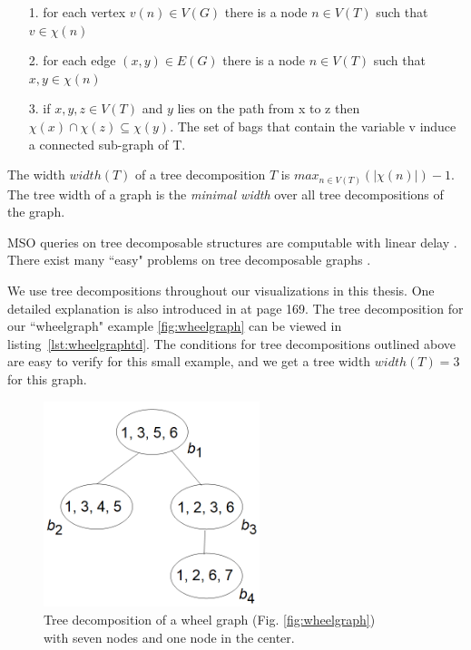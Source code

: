 \documentclass[a4paper, 12pt, bibliography=totoc]{scrartcl}
\begin{document}
\begin{itemize}
	\item[1.] for each vertex $v(n) \in V(G)$ there is a node $n \in V(T)$ such that $v \in \chi(n)$
	\item[2.] for each edge $(x,y) \in E(G)$ there is a node $n\in V(T)$ such that $x,y \in\chi(n)$
	\item[3.] if $x,y,z \in V(T)$ and $y$ lies on the path from x to z then $\chi(x) \cap \chi(z) \subseteq \chi(y)$. The set of bags that contain the variable v induce a connected sub-graph of T.
\end{itemize}
The width $width(T)$ of a tree decomposition $T$ is $max_{n\in V(T)}(|\chi(n)|)-1$.
The tree width of a graph is the \textit{minimal width} over all tree decompositions of the graph. 


MSO queries on tree decomposable structures are computable with linear delay \cite{MSOQueriesGuillaume}. There exist many ``easy" problems on tree decomposable graphs \cite{ARNBORG1991308}.

We use tree decompositions throughout our visualizations in this thesis. One detailed explanation is also introduced in \cite{pcgp2019} at page 169.
The tree decomposition for our ``wheelgraph" example \ref{fig:wheelgraph} can be viewed in listing~\ref{lst:wheelgraphtd}. The conditions for tree decompositions outlined above are easy to verify for this small example, and we get a tree width $width(T)=3$ for this graph.

\begin{figure}[h]
	\centering
	\includegraphics[height=6cm]{images/TDWheelgraph7.png}
		\caption[Tree decomposition of the wheel graph]{Tree decomposition of a wheel graph (Fig. \ref{fig:wheelgraph}) \\
		with seven nodes and one node in the center.}
	\label{fig:tdweelgraph7}
\end{figure}
\mbox{
}
\end{document}
